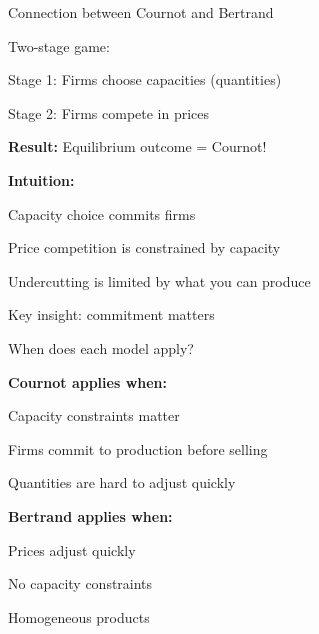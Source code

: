 \documentclass[notes,11pt, aspectratio=169]{beamer}
\newenvironment{wideitemize}{\itemize\addtolength{\itemsep}{10pt}}{\enditemize}
\newenvironment{wideenumerate}{\enumerate\addtolength{\itemsep}{10pt}}{\endenumerate}
\begin{document}
\begin{frame}{Connection between Cournot and Bertrand}
	\begin{wideitemize}
		\item Two-stage game:
		\begin{wideenumerate}
			\vspace{5pt}
			\item Stage 1: Firms choose capacities (quantities)
			\item Stage 2: Firms compete in prices
		\end{wideenumerate}
		\item \textbf{Result:} Equilibrium outcome = Cournot!
		\item \textbf{Intuition:}
		\begin{wideitemize}
			\vspace{5pt}
			\item Capacity choice commits firms
			\item Price competition is constrained by capacity
			\item Undercutting is limited by what you can produce
		\end{wideitemize}
		\item Key insight: commitment matters
	\end{wideitemize}
\end{frame}

\begin{frame}{When does each model apply?}
	\begin{wideitemize}
		\item \textbf{Cournot applies when:}
		\begin{wideitemize}
			\vspace{5pt}
			\item Capacity constraints matter
			\item Firms commit to production before selling
			\item Quantities are hard to adjust quickly
		\end{wideitemize}
		\item \textbf{Bertrand applies when:}
		\begin{wideitemize}
			\vspace{5pt}
			\item Prices adjust quickly
			\item No capacity constraints
			\item Homogeneous products
		\end{wideitemize}
	\end{wideitemize}
\end{frame}
\end{document}
